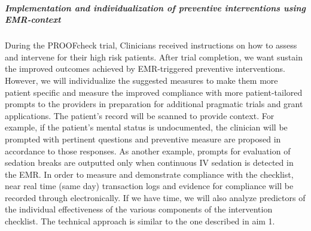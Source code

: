 \documentclass[11pt,notitlepage]{article}
\begin{document}
\subparagraph*{Implementation and individualization of preventive interventions using EMR-context}
During the PROOFcheck trial, Clinicians received instructions on how to assess and intervene for their high risk patients. After trial completion, we want sustain the improved outcomes achieved by EMR-triggered preventive interventions. However, we will individualize the suggested measures to make them more patient specific and measure the improved compliance with more patient-tailored prompts to the providers in preparation for additional pragmatic trials and grant applications. The patient's record will be scanned to provide context. For example, if the patient's mental status is undocumented, the clinician will be prompted with pertinent questions and preventive measure are proposed in accordance to those responses. As another example, prompts for evaluation of sedation breaks are outputted only when continuous IV sedation is detected in the EMR. In order to measure and demonstrate compliance with the checklist, near real time (same day) transaction logs and evidence for compliance will be recorded through electronically. If we have time, we will also analyze predictors of the individual effectiveness of the various components of the intervention checklist. The technical approach is similar to the one described in aim 1.


\newpage


\end{document}
